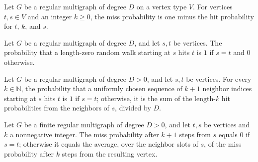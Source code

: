 \begin{definition}
\label{Randomized.RegularMultigraph.missProb}
\leanok
{}
Let $G$ be a regular multigraph of degree $D$ on a vertex type $V$. For vertices $t,s\in
V$ and an integer $k\ge 0$, the miss probability is one minus the hit probability for
$t$, $k$, and $s$.
\end{definition}

\begin{theorem}
\label{Randomized.RegularMultigraph.hitProb_zero}
\leanok
{}
Let $G$ be a regular multigraph of degree $D$, and let $s,t$ be vertices. The
probability that a length-zero random walk starting at $s$ hits $t$ is $1$ if $s=t$ and
$0$ otherwise.
\end{theorem}

\begin{theorem}
\label{Randomized.RegularMultigraph.hitProb_succ}
\leanok
{}
Let $G$ be a regular multigraph of degree $D>0$, and let $s,t$ be vertices. For every
$k\in\mathbb{N}$, the probability that a uniformly chosen sequence of $k+1$ neighbor
indices starting at $s$ hits $t$ is $1$ if $s=t$; otherwise, it is the sum of the
length-$k$ hit probabilities from the neighbors of $s$, divided by $D$.
\end{theorem}

\begin{theorem}
\label{Randomized.RegularMultigraph.missProb_succ}
\leanok
{}
Let $G$ be a finite regular multigraph of degree $D>0$, and let $t,s$ be vertices and
$k$ a nonnegative integer. The miss probability after $k+1$ steps from $s$ equals $0$ if
$s=t$; otherwise it equals the average, over the neighbor slots of $s$, of the miss
probability after $k$ steps from the resulting vertex.
\end{theorem}

